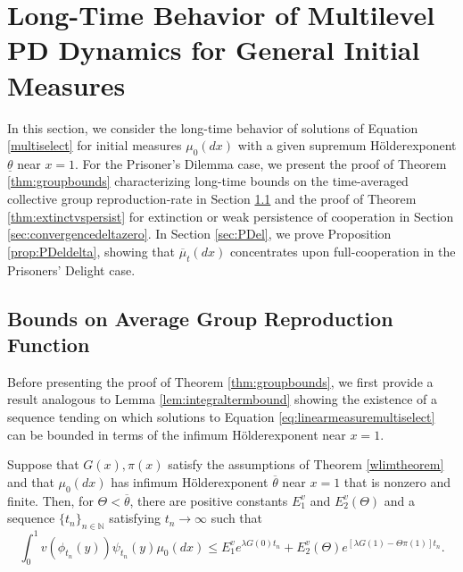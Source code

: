 \documentclass[11pt]{article}
\numberwithin{equation}{section}
\newcommand{\NN}{\mathbb{N}}
\newcommand{\ol}{\overline}
\newcommand{\holder}{H{\"o}lder\:}
\begin{document}
{ \section{Long-Time Behavior of Multilevel PD Dynamics for General Initial Measures} \label{sec:extinctionsurvival}

In this section, we consider the long-time behavior of solutions of Equation \eqref{multiselect} for initial measures $\mu_0(dx)$ with a given supremum \holder exponent $\underline{\theta}$ near $x=1$. 
For the Prisoner's Dilemma case, we present the proof of Theorem \ref{thm:groupbounds} characterizing long-time bounds on the time-averaged collective group reproduction-rate in Section \ref{sec:groupbounds} and the proof of Theorem \ref{thm:extinctvspersist} for extinction or weak persistence of cooperation in Section \ref{sec:convergencedeltazero}. In Section \ref{sec:PDel}, we prove Proposition \ref{prop:PDeldelta}, showing that $\ol{\mu}_t(dx)$ concentrates upon full-cooperation in the Prisoners' Delight case.


\subsection{Bounds on Average Group Reproduction Function}
\label{sec:groupbounds}

Before presenting the proof of Theorem \ref{thm:groupbounds}, we first provide a result analogous to Lemma \ref{lem:integraltermbound} showing the existence of a sequence tending on which solutions to Equation \eqref{eq:linearmeasuremultiselect} can be bounded in terms of the infimum \holder exponent near $x=1$. 
%
\begin{lemma} \label{lem:massinfimumbound}
Suppose that $G(x), \pi(x)$ satisfy the assumptions of Theorem \ref{wlimtheorem} and that $\mu_0(dx)$ has infimum \holder exponent $\overline{\theta}$ near $x=1$ that is nonzero and finite. Then, for $\Theta < \overline{\theta}$, there are positive constants $E_1^v$ and $E_2^v(\Theta)$ and a sequence $\{t_n\}_{n \in \NN}$ satisfying $t_n \to \infty$ such that 
\begin{equation} \label{eq:infbothtermrates}
 \int_0^1 v(\phi_{t_n}(y))\psi_{t_n}(y)\mu_0(dx) \leq E_1^v e^{\lambda G(0) t_n} + E_2^v(\Theta) e^{\left[\lambda G(1) - \Theta \pi(1) \right] t_n}.  
\end{equation}
\end{lemma}

}
\end{document}
